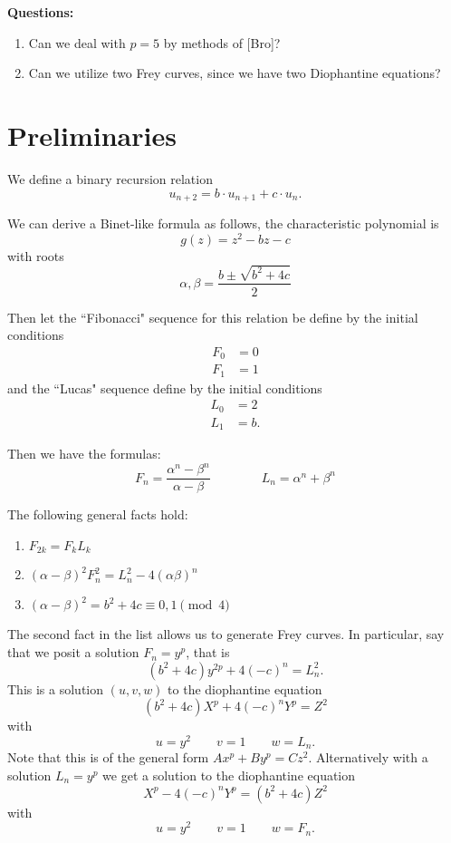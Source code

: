 \documentclass[12pt]{article}
\begin{document}
\textbf{Questions:}
\begin{enumerate}
\item  Can we deal with $p=5$ by methods of [Bro]? 
\item Can we utilize two Frey curves, since we have two Diophantine equations?
\end{enumerate}


\section{Preliminaries}

We define a binary recursion relation
\[ u_{n+2} = b\cdot u_{n+1}+ c\cdot u_n. \]

We can derive a Binet-like formula as follows, the characteristic polynomial is
\[ g(z) = z^2 - bz - c\]
with roots
\[ \alpha, \beta = \frac{b \pm \sqrt{b^2+4c}}{2} \]

Then let the ``Fibonacci" sequence for this relation be define by the initial conditions
\begin{align*}
F_0 &= 0 \\
F_1 & = 1 
\end{align*}
and the ``Lucas" sequence define by the initial conditions
\begin{align*}
L_0 &= 2 \\
L_1 & = b. 
\end{align*}

Then we have the formulas:
\[F_n = \frac{\alpha^n - \beta^n}{\alpha - \beta} \qquad \qquad L_n = \alpha^n +\beta^n \]

The following general facts hold:

\begin{enumerate}

\item $F_{2k} = F_kL_k$

\item $(\alpha - \beta)^2F_n^2 = L_n^2 - 4(\alpha\beta)^n$

\item $(\alpha - \beta)^2 = b^2+4c \equiv 0,1 \pmod{4}$

\end{enumerate}

The second fact in the list allows us to generate Frey curves.  In particular, say that we posit a solution $F_n = y^p$, that is
\[ (b^2+4c)y^{2p}+4(-c)^n = L_n^2 .\]
This is a solution $(u,v,w)$ to the diophantine equation
\[ (b^2+4c)X^p +4(-c)^nY^p = Z^2 \]
with 
\[ u = y^2 \qquad v = 1 \qquad w = L_n .\]
Note that this is of the general form $Ax^p+By^p = Cz^2$.  Alternatively with a solution $L_n = y^p$ we get a solution to the diophantine equation
\[ X^p-4(-c)^nY^p = (b^2+4c)Z^2 \]
with
\[ u = y^2 \qquad v = 1 \qquad w = F_n .\]
\end{document}
